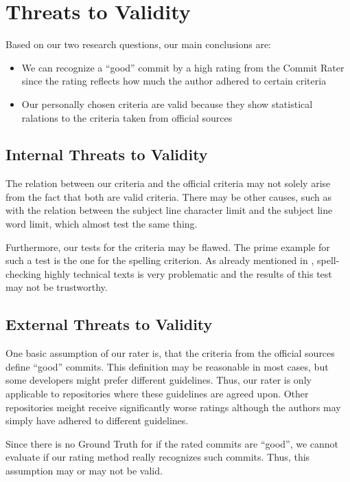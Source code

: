 \section{Threats to Validity}
\label{sec:threats-to-validity}
%

Based on our two research questions, our main conclusions are:
\begin{itemize}
  \item We can recognize a ``good'' commit by a high rating from the Commit Rater since the rating reflects how much the author adhered to certain criteria
  \item Our personally chosen criteria are valid because they show statistical ralations to the criteria taken from official sources
\end{itemize}


\subsection{Internal Threats to Validity}
\label{sec:internal-threats}

The relation between our criteria and the official criteria may not solely arise from the fact that both are valid criteria. There may be other causes, such as with the relation between the subject line character limit and the subject line word limit, which almost test the same thing.

Furthermore, our tests for the criteria may be flawed. The prime example for such a test is the one for the spelling criterion. As already mentioned in \label{subs:no_misspelling}, spell-checking highly technical texts is very problematic and the results of this test may not be trustworthy.

\subsection{External Threats to Validity}
\label{sec:external-threats}

One basic assumption of our rater is, that the criteria from the official sources define ``good'' commits. This definition may be reasonable in most cases, but some developers might prefer different guidelines. Thus, our rater is only applicable to repositories where these guidelines are agreed upon. Other repositories meight receive significantly worse ratings although the authors may simply have adhered to different guidelines.

Since there is no Ground Truth for if the rated commits are ``good'', we cannot evaluate if our rating method really recognizes such commits. Thus, this assumption may or may not be valid.
